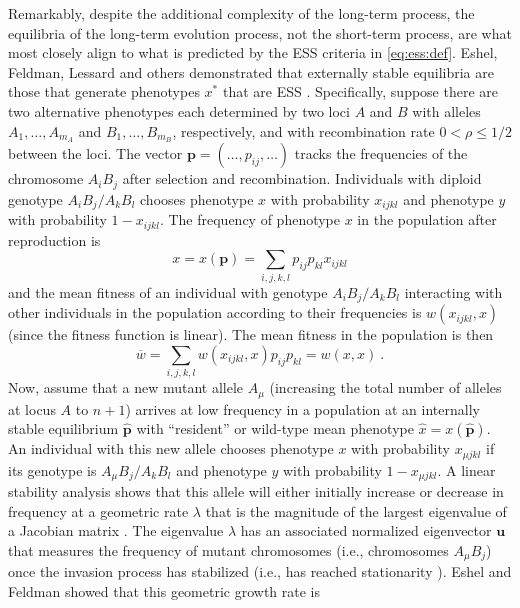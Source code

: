 \documentclass[11pt]{article}
\newcommand{\mean}[1]{\overline{#1}}
\newcommand{\ess}[1]{#1^*}
\newcommand{\fixp}[1]{\hat{#1}}
\renewcommand{\vec}[1]{\symbf{#1}}
\newcommand{\rec}{\rho}
\newcommand{\mut}{\mu}
\newcommand{\eig}{\lambda}
\begin{document}
Remarkably, despite the additional complexity of the long-term process, the equilibria of the long-term evolution process, not the short-term process, are what most closely align to what is predicted by the ESS criteria in \eqref{eq:ess:def}. Eshel, Feldman, Lessard and others demonstrated that externally stable equilibria are those that generate phenotypes $\ess{x}$ that are ESS \cite{Eshel:Feldman:1984,Liberman:1988,Eshel:1996,Hammerstein:Selten:1994,Hammerstein:1996,Weissing:1996,Eshel:Feldman:1998}. Specifically, suppose there are two alternative phenotypes each determined by two loci $A$ and $B$ with alleles $A_{1},\ldots,A_{m_{A}}$ and $B_{1},\ldots,B_{m_{B}}$, respectively, and with recombination rate $0<\rec\le1/2$ between the loci. The vector $\vec{p} = (\ldots,p_{ij},\ldots)$ tracks the frequencies of the chromosome $A_{i} B_{j}$ after selection and recombination. Individuals with diploid genotype $A_{i}B_{j}/A_{k}B_{l}$ chooses phenotype $x$ with probability $x_{ijkl}$ and phenotype $y$ with probability $1 - x_{ijkl}$. The frequency of phenotype $x$ in the population after reproduction is
\begin{equation*}
  x = x(\vec{p}) = \sum_{i,j,k,l} p_{ij} p_{kl} x_{ijkl}
\end{equation*}
and the mean fitness of an individual with genotype $A_{i}B_{j}/A_{k}B_{l}$ interacting with other individuals in the population according to their frequencies is $w(x_{ijkl}, x)$ (since the fitness function is linear). The mean fitness in the population is then
\begin{equation*}
  \mean{w} = \sum_{i,j,k,l} w(x_{ijkl}, x) p_{ij} p_{kl} = w(x, x) \: .
\end{equation*}
Now, assume that a new mutant allele $A_{\mut}$ (increasing the total number of alleles at locus $A$ to $n+1$) arrives at low frequency in a population at an internally stable equilibrium $\fixp{\vec{p}}$ with ``resident'' or wild-type mean phenotype $\fixp{x} = x(\fixp{\vec{p}})$. An individual with this new allele chooses phenotype $x$ with probability $x_{\mut jkl}$ if its genotype is $A_{\mut}B_{j}/A_{k}B_{l}$ and phenotype $y$ with probability $1 - x_{\mut jkl}$. A linear stability analysis shows that this allele will either initially increase or decrease in frequency at a geometric rate $\eig$ that is the magnitude of the largest eigenvalue of a Jacobian matrix \cite{Edelstein-Keshet:2005}. The eigenvalue $\eig$ has an associated normalized eigenvector $\vec{u}$ that measures the frequency of mutant chromosomes (i.e., chromosomes $A_{\mut} B_{j}$) once the invasion process has stabilized (i.e., has reached stationarity \cite{Caswell:2006}). Eshel and Feldman \cite{Eshel:Feldman:1984,Eshel:Feldman:1998} showed that this geometric growth rate is
\end{document}
